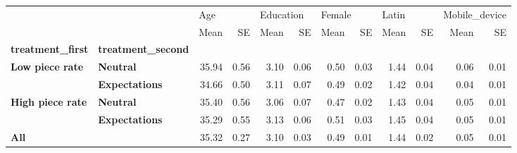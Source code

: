 \begin{tabular}{llrrrrrrrrrr}
\toprule
    &              & \multicolumn{2}{l}{Age} & \multicolumn{2}{l}{Education} & \multicolumn{2}{l}{Female} & \multicolumn{2}{l}{Latin} & \multicolumn{2}{l}{Mobile\_device} \\
    &              &  Mean &   SE &      Mean &   SE &   Mean &   SE &  Mean &   SE &          Mean &   SE \\
\textbf{treatment\_first} & \textbf{treatment\_second} &       &      &           &      &        &      &       &      &               &      \\
\midrule
\textbf{Low piece rate} & \textbf{Neutral} & 35.94 & 0.56 &      3.10 & 0.06 &   0.50 & 0.03 &  1.44 & 0.04 &          0.06 & 0.01 \\
    & \textbf{Expectations} & 34.66 & 0.50 &      3.11 & 0.07 &   0.49 & 0.02 &  1.42 & 0.04 &          0.04 & 0.01 \\
\textbf{High piece rate} & \textbf{Neutral} & 35.40 & 0.56 &      3.06 & 0.07 &   0.47 & 0.02 &  1.43 & 0.04 &          0.05 & 0.01 \\
    & \textbf{Expectations} & 35.29 & 0.55 &      3.13 & 0.06 &   0.51 & 0.03 &  1.45 & 0.04 &          0.05 & 0.01 \\
\textbf{All} &              & 35.32 & 0.27 &      3.10 & 0.03 &   0.49 & 0.01 &  1.44 & 0.02 &          0.05 & 0.01 \\
\bottomrule
\end{tabular}

